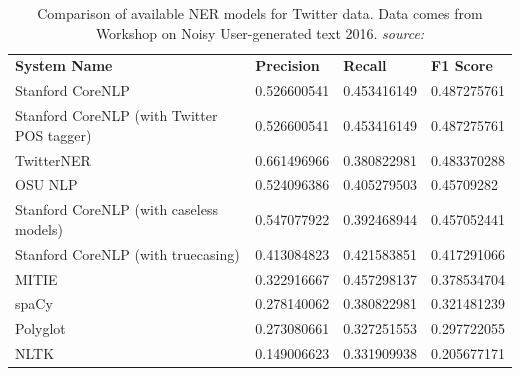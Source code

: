 \begin{table}[h]
\footnotesize
\begin{tabular}{llll}
\textbf{System Name}                & \textbf{Precision}  & \textbf{Recall}   & \textbf{F1 Score}  \\
Stanford CoreNLP              & 0.526600541 & 0.453416149 & 0.487275761 \\
Stanford CoreNLP (with Twitter POS tagger) & 0.526600541 & 0.453416149 & 0.487275761 \\
TwitterNER                 & 0.661496966 & 0.380822981 & 0.483370288 \\
OSU NLP                  & 0.524096386 & 0.405279503 & 0.45709282 \\
Stanford CoreNLP (with caseless models)  & 0.547077922 & 0.392468944 & 0.457052441 \\
Stanford CoreNLP (with truecasing)     & 0.413084823 & 0.421583851 & 0.417291066 \\
MITIE                   & 0.322916667 & 0.457298137 & 0.378534704 \\
spaCy                   & 0.278140062 & 0.380822981 & 0.321481239 \\
Polyglot                  & 0.273080661 & 0.327251553 & 0.297722055 \\
NLTK                    & 0.149006623 & 0.331909938 & 0.205677171 \\ 
\end{tabular}
\caption{Comparison of available NER models for Twitter data. Data comes from Workshop on Noisy User-generated text \cite{wnut} 2016. \newline \textit{source: \cite{TwitterNerComparison}}}
\label{tab:nerComparison}
\end{table}

